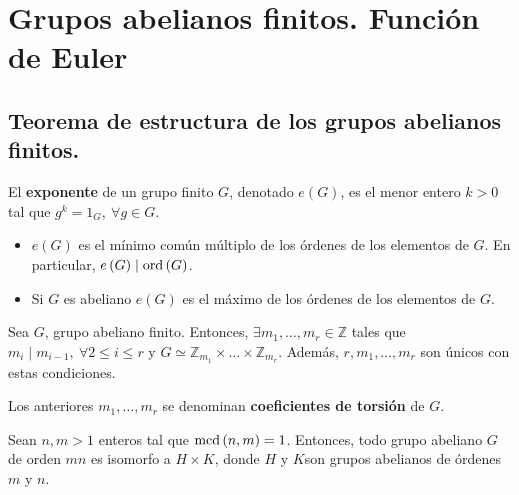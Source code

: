 \chapter{Grupos abelianos finitos. Función\\ de Euler}
\section{Teorema de estructura de los grupos abelianos finitos.}
\begin{defi}[Exponente]
El \textbf{exponente} de un grupo finito $G$, denotado $e\left( G \right)$, es el menor entero $k > 0$ tal que $g^k = 1_G,\ \forall g \in G$.
\end{defi}

\begin{prop}
\begin{itemize}
\item $e\left( G \right)$ es el mínimo común múltiplo de los órdenes de los elementos de $G$. En particular, $e\left( G \right) \mid \operatorname{ord}\left( G \right)$.
\item Si $G$ es abeliano $e\left( G \right)$ es el máximo de los órdenes de los elementos de $G$.
\end{itemize}
\end{prop}

\begin{theo}
    Sea $G$, grupo abeliano finito. Entonces, $\exists m_1, \ldots, m_r \in \mathbb{Z}$ tales que $m_i \mid m_{i-1},\ \forall 2 \le i \le r$ y $G \simeq \mathbb{Z}_{m_1} \times \ldots \times \mathbb{Z}_{m_r}$. Además, $r, m_1, \ldots, m_r$ son únicos con estas condiciones.
\end{theo}

\begin{defi}
Los anteriores $m_1, \ldots, m_r$ se denominan \textbf{coeficientes de torsión} de $G$.
\end{defi}

\begin{prop}
Sean $n, m > 1$ enteros tal que $\operatorname{mcd} \left( n, m \right) = 1$. Entonces, todo grupo abeliano $G$ de orden $mn$ es isomorfo a $H \times K$, donde $H$ y $K$son grupos abelianos de órdenes $m$ y $n$.
\end{prop}
